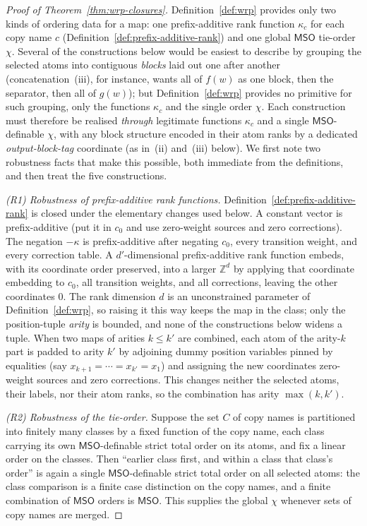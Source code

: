 \documentclass[11pt]{article}
\theoremstyle{definition}
\newcommand{\Z}{\mathbb Z}
\newcommand{\MSO}{\mathsf{MSO}}
\begin{document}
\begin{proof}[Proof of Theorem~\ref{thm:wrp-closures}]
Definition~\ref{def:wrp} provides only two kinds of ordering data for a map:
one prefix-additive rank function $\kappa_c$ for each copy name $c$
(Definition~\ref{def:prefix-additive-rank}) and one global $\MSO$ tie-order
$\chi$.
Several of the constructions below would be
easiest to describe by grouping the selected atoms into contiguous \emph{blocks}
laid out one after another (concatenation~(iii), for instance, wants all of
$f(w)$ as one block, then the separator, then all of $g(w)$); but
Definition~\ref{def:wrp} provides no primitive for such grouping, only the
functions $\kappa_c$ and the single order $\chi$.  Each construction must
therefore be realised \emph{through} legitimate functions $\kappa_c$ and a
single $\MSO$-definable $\chi$, with any block structure encoded in their atom
ranks by a dedicated \emph{output-block-tag} coordinate (as in~(ii) and~(iii)
below).  We first note two robustness facts that make this possible, both
immediate from the definitions, and then treat the five constructions.

\vspace{0.5em}
\noindent\emph{(R1) Robustness of prefix-additive rank functions.}
Definition~\ref{def:prefix-additive-rank} is closed under the elementary
changes used below.  A constant vector is prefix-additive (put it in $c_0$ and
use zero-weight sources and zero corrections).  The negation $-\kappa$ is
prefix-additive after negating $c_0$, every transition weight, and every
correction table.  A $d'$-dimensional prefix-additive rank function embeds,
with its coordinate order preserved, into a larger $\Z^d$ by applying that
coordinate embedding to $c_0$, all transition weights, and all corrections,
leaving the other coordinates $0$.  The rank
dimension $d$ is an unconstrained parameter of Definition~\ref{def:wrp}, so
raising it this way keeps the map in the class; only the
position-tuple \emph{arity} is bounded, and none of the constructions below
widens a tuple.  When two maps of arities $k\le k'$ are combined, each
atom of the arity-$k$ part is padded to arity $k'$ by adjoining dummy position
variables pinned by equalities (say $x_{k+1}=\cdots=x_{k'}=x_1$) and assigning
the new coordinates zero-weight sources and zero corrections.  This changes
neither the selected atoms, their labels, nor their atom ranks, so the combination
has arity $\max(k,k')$.

\vspace{0.5em}
\noindent\emph{(R2) Robustness of the tie-order.}
Suppose the set $C$ of copy names is partitioned into finitely many classes by
a fixed function of the copy name, each class carrying its own $\MSO$-definable
strict total order on its atoms, and fix a linear order on the classes.  Then
``earlier class first, and within a class that class's order'' is again a single
$\MSO$-definable strict total order on all selected atoms: the class comparison
is a finite case distinction on the copy names, and a finite combination of
$\MSO$ orders is $\MSO$.  This supplies the global $\chi$ whenever sets of copy
names are merged.


\end{proof}
\end{document}
